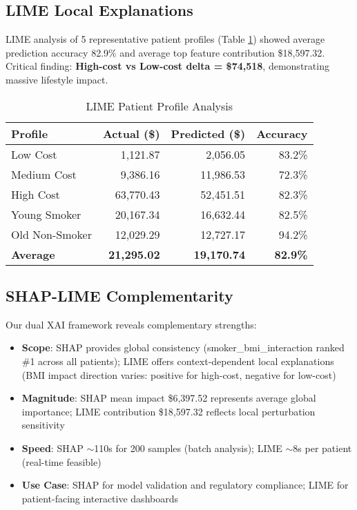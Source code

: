 \documentclass[conference]{IEEEtran}
\begin{document}
\subsection{LIME Local Explanations}
LIME analysis of 5 representative patient profiles (Table \ref{tab:lime}) showed average prediction accuracy 82.9\% and average top feature contribution \$18,597.32. Critical finding: \textbf{High-cost vs Low-cost delta = \$74,518}, demonstrating massive lifestyle impact.

\begin{table}[htbp]
\caption{LIME Patient Profile Analysis}
\begin{center}
\begin{tabular}{|l|r|r|r|}
\hline
\textbf{Profile} & \textbf{Actual (\$)} & \textbf{Predicted (\$)} & \textbf{Accuracy} \\
\hline
Low Cost & 1,121.87 & 2,056.05 & 83.2\% \\
Medium Cost & 9,386.16 & 11,986.53 & 72.3\% \\
High Cost & 63,770.43 & 52,451.51 & 82.3\% \\
Young Smoker & 20,167.34 & 16,632.44 & 82.5\% \\
Old Non-Smoker & 12,029.29 & 12,727.17 & 94.2\% \\
\hline
\textbf{Average} & \textbf{21,295.02} & \textbf{19,170.74} & \textbf{82.9\%} \\
\hline
\end{tabular}
\label{tab:lime}
\end{center}
\end{table}

\subsection{SHAP-LIME Complementarity}
Our dual XAI framework reveals complementary strengths:
\begin{itemize}
\item \textbf{Scope}: SHAP provides global consistency (smoker\_bmi\_interaction ranked \#1 across all patients); LIME offers context-dependent local explanations (BMI impact direction varies: positive for high-cost, negative for low-cost)
\item \textbf{Magnitude}: SHAP mean impact \$6,397.52 represents average global importance; LIME contribution \$18,597.32 reflects local perturbation sensitivity
\item \textbf{Speed}: SHAP $\sim$110s for 200 samples (batch analysis); LIME $\sim$8s per patient (real-time feasible)
\item \textbf{Use Case}: SHAP for model validation and regulatory compliance; LIME for patient-facing interactive dashboards
\end{itemize}
\end{document}
